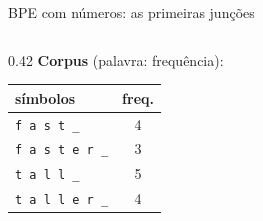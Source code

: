 \begin{frame}{BPE com números: as primeiras junções}
    \begin{columns}[c]
        \begin{column}{0.42\textwidth}
            \small
            \textbf{Corpus} (palavra: frequência):
            \vspace{0.1cm}

            \centering
            \footnotesize
            \begin{tabular}{lc}
                \toprule
                símbolos & freq. \\
                \midrule
                \texttt{f a s t \_} & 4 \\
                \texttt{f a s t e r \_} & 3 \\
                \texttt{t a l l \_} & 5 \\
                \texttt{t a l l e r \_} & 4 \\
                \bottomrule
            \end{tabular}


\end{column}
\end{columns}
\end{frame}
